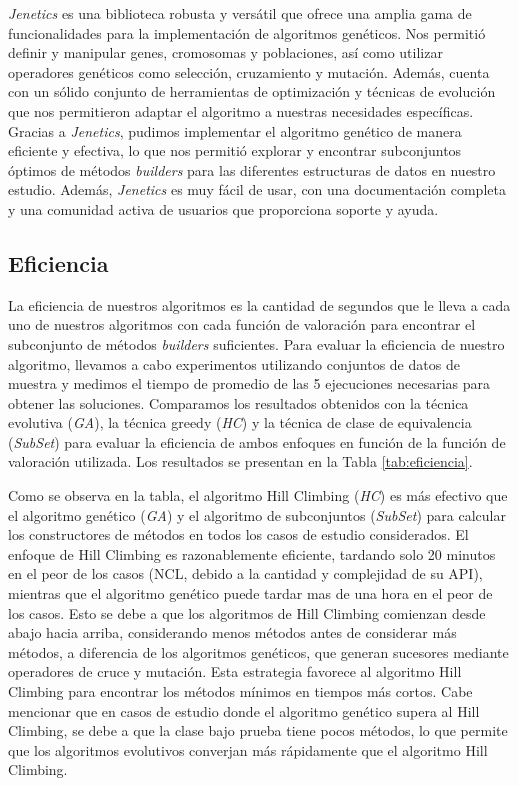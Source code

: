 \emph{Jenetics} es una biblioteca robusta y versátil que ofrece una amplia gama de funcionalidades para la implementación de algoritmos genéticos. Nos permitió definir y manipular genes, cromosomas y poblaciones, así como utilizar operadores genéticos como selección, cruzamiento y mutación. Además, cuenta con un sólido conjunto de herramientas de optimización y técnicas de evolución que nos permitieron adaptar el algoritmo a nuestras necesidades específicas.
Gracias a \emph{Jenetics}, pudimos implementar el algoritmo genético de manera eficiente y efectiva, lo que nos permitió explorar y encontrar subconjuntos óptimos de métodos \emph{builders} para las diferentes estructuras de datos en nuestro estudio. Además, \emph{Jenetics} es muy fácil de usar, con una documentación completa y una comunidad activa de usuarios que proporciona soporte y ayuda. 

\subsection{Eficiencia}\label{sec:eficiencia}
La eficiencia de nuestros algoritmos es la cantidad de segundos que le lleva a cada uno de nuestros algoritmos con cada función de valoración para encontrar el subconjunto de métodos \emph{builders} suficientes. Para evaluar la eficiencia de nuestro algoritmo, llevamos a cabo experimentos utilizando conjuntos de datos de muestra y medimos el tiempo de promedio de las 5 ejecuciones necesarias para obtener las soluciones. Comparamos los resultados obtenidos con la técnica evolutiva (\emph{GA}), la técnica greedy (\emph{HC}) y la técnica de clase de equivalencia (\emph{SubSet}) para evaluar la eficiencia de ambos enfoques en función de la función de valoración utilizada. Los resultados se presentan en la Tabla \ref{tab:eficiencia}.


Como se observa en la tabla, el algoritmo Hill Climbing (\emph{HC}) es más efectivo que el algoritmo genético (\emph{GA}) y el algoritmo de subconjuntos (\emph{SubSet}) para calcular los constructores de métodos en todos los casos de estudio considerados. El enfoque de Hill Climbing es razonablemente eficiente, tardando solo 20 minutos en el peor de los casos (NCL, debido a la cantidad y complejidad de su API), mientras que el algoritmo genético puede tardar mas de una hora en el peor de los casos. Esto se debe a que los algoritmos de Hill Climbing comienzan desde abajo hacia arriba, considerando menos métodos antes de considerar más métodos, a diferencia de los algoritmos genéticos, que generan sucesores mediante operadores de cruce y mutación. Esta estrategia favorece al algoritmo Hill Climbing para encontrar los métodos mínimos en tiempos más cortos. Cabe mencionar que en casos de estudio donde el algoritmo genético supera al Hill Climbing, se debe a que la clase bajo prueba tiene pocos métodos, lo que permite que los algoritmos evolutivos converjan más rápidamente que el algoritmo Hill Climbing.

